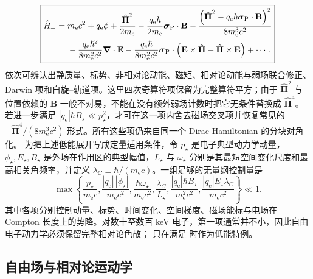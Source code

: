 \begin{equation}
 \boxed{
 \begin{aligned}
 \hat H_{+}
 ={}&m_{\mathrm e} c^2+q_{\mathrm e}\phi
 +\frac{\hat{\boldsymbol\Pi}^2}{2m_{\mathrm e}}
 -\frac{q_{\mathrm e}\hbar}{2m_{\mathrm e}}\boldsymbol\sigma_{\rm P}\cdot\mathbf B
 -\frac{\left(\hat{\boldsymbol\Pi}^2-q_{\mathrm e}\hbar\boldsymbol\sigma_{\rm P}\cdot\mathbf B\right)^2}{8m_{\mathrm e}^3c^2}\\
 &-\frac{q_{\mathrm e}\hbar^2}{8m_{\mathrm e}^2c^2}\boldsymbol\nabla\cdot\mathbf E
 -\frac{q_{\mathrm e}\hbar}{8m_{\mathrm e}^2c^2}
 \boldsymbol\sigma_{\rm P}\cdot
 \left(\mathbf E\times\hat{\boldsymbol\Pi}
 -\hat{\boldsymbol\Pi}\times\mathbf E\right)+\cdots.
 \end{aligned}}
 \label{eq:fw-pauli}
\end{equation}
依次可辨认出静质量、标势、非相对论动能、磁矩、相对论动能与弱场联合修正、Darwin 项和自旋--轨道项。这里四次奇算符项保留为完整算符平方；由于 $\hat{\boldsymbol\Pi}^2$ 与位置依赖的 $\mathbf B$ 一般不对易，不能在没有额外弱场计数时把它无条件替换成 $\hat{\boldsymbol\Pi}^4$。若进一步满足 $|q_{\mathrm e}|\hbar B_\star\ll p_\star^2$，才可在这一项内舍去磁场交叉项并恢复常见的 $-\hat{\boldsymbol\Pi}^4/(8m_{\mathrm e}^3c^2)$ 形式。所有这些项仍来自同一个 Dirac Hamiltonian 的分块对角化。
为把上述低能展开写成定量适用条件，令 $p_\star$ 是电子典型动力学动量，$\phi_\star,E_\star,B_\star$ 是外场在作用区的典型幅值，$L_\star$ 与 $\omega_\star$ 分别是其最短空间变化尺度和最高相关角频率，并定义 $\lambda_C\equiv\hbar/(m_{\mathrm e} c)$。一组足够的无量纲控制量是
\begin{equation}
 \max\!\left\{
 \frac{p_\star}{m_{\mathrm e} c},
 \frac{|q_{\mathrm e}|\,|\phi_\star|}{m_{\mathrm e} c^2},
 \frac{\hbar\omega_\star}{m_{\mathrm e} c^2},
 \frac{\lambda_C}{L_\star},
 \frac{|q_{\mathrm e}|\hbar B_\star}{m_{\mathrm e}^2c^2},
 \frac{|q_{\mathrm e}|E_\star\lambda_C}{m_{\mathrm e} c^2}
 \right\}\ll1.
 \label{eq:fw-control-set-r16}
\end{equation}
其中各项分别控制动量、标势、时间变化、空间梯度、磁场能标与电场在 Compton 长度上的势降。对数十至数百 keV 电子，第一项通常并不小，因此自由电子动力学必须保留完整相对论色散； 只在满足  时作为低能特例。

\subsection{自由场与相对论运动学}\label{sec:feqo-positive-spinor}

